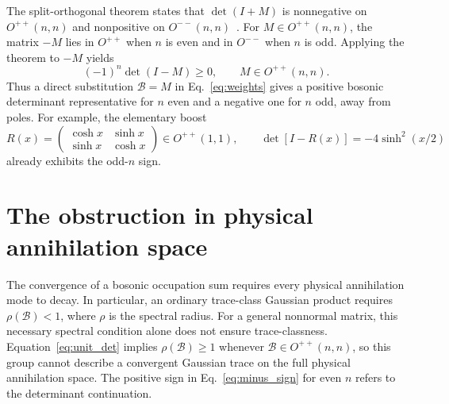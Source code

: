 \documentclass[11pt,a4paper]{article}
\newcommand{\mc}[1]{\mathcal{#1}}
\begin{document}
The split-orthogonal theorem states that $\det(I+M)$ is nonnegative on
$O^{++}(n,n)$ and nonpositive on $O^{--}(n,n)$~\cite{wang2015prl}.
For $M\in O^{++}(n,n)$, the matrix $-M$ lies in $O^{++}$ when $n$ is even
and in $O^{--}$ when $n$ is odd. Applying the theorem to $-M$ yields
\begin{equation}
    \boxed{(-1)^n\det(I-M)\geq0,\qquad M\in O^{++}(n,n).}
    \label{eq:minus_sign}
\end{equation}
Thus a direct substitution $\mc B=M$ in Eq.~\eqref{eq:weights} gives a
positive bosonic determinant representative for $n$ even and a negative one
for $n$ odd, away from poles. For example, the elementary boost
\begin{equation}
    R(x)=
    \begin{pmatrix}\cosh x&\sinh x\\ \sinh x&\cosh x\end{pmatrix}
    \in O^{++}(1,1),
    \qquad
    \det[I-R(x)]=-4\sinh^2(x/2)
    \label{eq:boost}
\end{equation}
already exhibits the odd-$n$ sign.

\section{The obstruction in physical annihilation space}
\label{sec:annihilation_obstruction}

The convergence of a bosonic occupation sum requires every physical
annihilation mode to decay. In particular, an ordinary trace-class Gaussian
product requires $\rho(\mc B)<1$, where $\rho$ is the spectral radius.
For a general nonnormal matrix, this necessary spectral condition alone
does not ensure trace-classness. Equation~\eqref{eq:unit_det} implies
$\rho(\mc B)\geq1$ whenever $\mc B\in O^{++}(n,n)$, so this group cannot
describe a convergent Gaussian trace on the full physical annihilation
space. The positive sign in Eq.~\eqref{eq:minus_sign} for even $n$ refers
to the determinant continuation.
\end{document}
